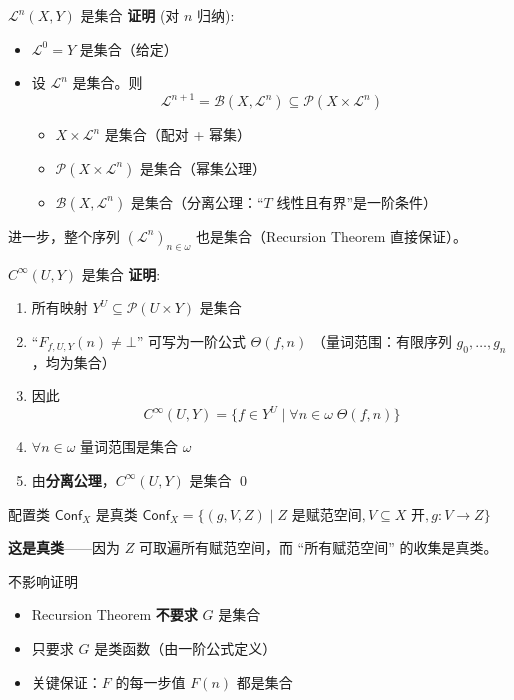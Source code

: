\documentclass[10pt,aspectratio=169]{beamer}
\newcommand{\calL}{\mathcal{L}}
\newcommand{\calB}{\mathcal{B}}
\newcommand{\calP}{\mathcal{P}}
\begin{document}
\begin{frame}{$\calL^n(X, Y)$ 是集合}
  \textbf{证明} (对 $n$ 归纳):

  \medskip
  \begin{itemize}
    \item[$n=0$:] $\calL^0 = Y$ 是集合（给定）
    \item[$n \to n+1$:] 设 $\calL^n$ 是集合。则
    \[
      \calL^{n+1} = \calB(X, \calL^n) \subseteq \calP(X \times \calL^n)
    \]
    \begin{itemize}
      \item $X \times \calL^n$ 是集合（配对 + 幂集）
      \item $\calP(X \times \calL^n)$ 是集合（幂集公理）
      \item $\calB(X, \calL^n)$ 是集合（分离公理：``$T$ 线性且有界''是一阶条件）
    \end{itemize}
  \end{itemize}

  \medskip
  进一步，整个序列 $(\calL^n)_{n \in \omega}$ 也是集合（Recursion Theorem 直接保证）。
\end{frame}

\begin{frame}{$C^\infty(U, Y)$ 是集合}
  \textbf{证明}:

  \medskip
  \begin{enumerate}
    \item 所有映射 $Y^U \subseteq \calP(U \times Y)$ 是集合
    \item ``$F_{f,U,Y}(n) \neq \bot$'' 可写为一阶公式 $\Theta(f, n)$
          （量词范围：有限序列 $g_0, \ldots, g_n$，均为集合）
    \item 因此
    \[
      C^\infty(U, Y) = \bigl\{ f \in Y^U \;\big|\; \forall n \in \omega\; \Theta(f, n) \bigr\}
    \]
    \item $\forall n \in \omega$ 量词范围是集合 $\omega$
    \item 由\textbf{分离公理}，$C^\infty(U, Y)$ 是集合 \qed
  \end{enumerate}
\end{frame}

\begin{frame}{配置类 $\mathsf{Conf}_X$ 是真类}
  $\mathsf{Conf}_X = \{(g, V, Z) \mid Z \text{ 是赋范空间}, V \subseteq X \text{ 开}, g: V \to Z\}$

  \medskip
  \textbf{这是真类}——因为 $Z$ 可取遍所有赋范空间，而 ``所有赋范空间'' 的收集是真类。

  \medskip
  \begin{block}{不影响证明}
    \begin{itemize}
      \item Recursion Theorem \textbf{不要求} $G$ 是集合
      \item 只要求 $G$ 是类函数（由一阶公式定义）
      \item 关键保证：$F$ 的每一步值 $F(n)$ 都是集合
    \end{itemize}
  \end{block}
\end{frame}
\end{document}
